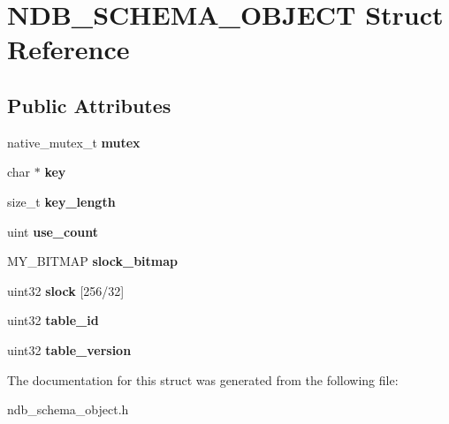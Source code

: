 \hypertarget{structNDB__SCHEMA__OBJECT}{}\section{N\+D\+B\+\_\+\+S\+C\+H\+E\+M\+A\+\_\+\+O\+B\+J\+E\+CT Struct Reference}
\label{structNDB__SCHEMA__OBJECT}
\subsection*{Public Attributes}
\begin{DoxyCompactItemize}
\item 
\mbox{\label{structNDB__SCHEMA__OBJECT_a3f4f4f3b9a1829869db8c995988c6dee}} 
native\+\_\+mutex\+\_\+t {\bfseries mutex}
\item 
\mbox{\label{structNDB__SCHEMA__OBJECT_ad457b364c95a8fe543cd0d3cb9d43117}} 
char $\ast$ {\bfseries key}
\item 
\mbox{\label{structNDB__SCHEMA__OBJECT_a0a2a3ee05518872d1f0a5deed2e298e4}} 
size\+\_\+t {\bfseries key\+\_\+length}
\item 
\mbox{\label{structNDB__SCHEMA__OBJECT_ae2c0aed0cbc8c395a1e3a478f6aaac3c}} 
uint {\bfseries use\+\_\+count}
\item 
\mbox{\label{structNDB__SCHEMA__OBJECT_a41681fe43f0ecb1b443fd7197c83e785}} 
M\+Y\+\_\+\+B\+I\+T\+M\+AP {\bfseries slock\+\_\+bitmap}
\item 
\mbox{\label{structNDB__SCHEMA__OBJECT_ab76765bea49a5b2d08f81ef521ff3156}} 
uint32 {\bfseries slock} \mbox{[}256/32\mbox{]}
\item 
\mbox{\label{structNDB__SCHEMA__OBJECT_acc7772df39f0049915a94239c3a52962}} 
uint32 {\bfseries table\+\_\+id}
\item 
\mbox{\label{structNDB__SCHEMA__OBJECT_a02f8dc8246c1603f79188045d0889bef}} 
uint32 {\bfseries table\+\_\+version}
\end{DoxyCompactItemize}


The documentation for this struct was generated from the following file\+:\begin{DoxyCompactItemize}
\item 
ndb\+\_\+schema\+\_\+object.\+h\end{DoxyCompactItemize}
